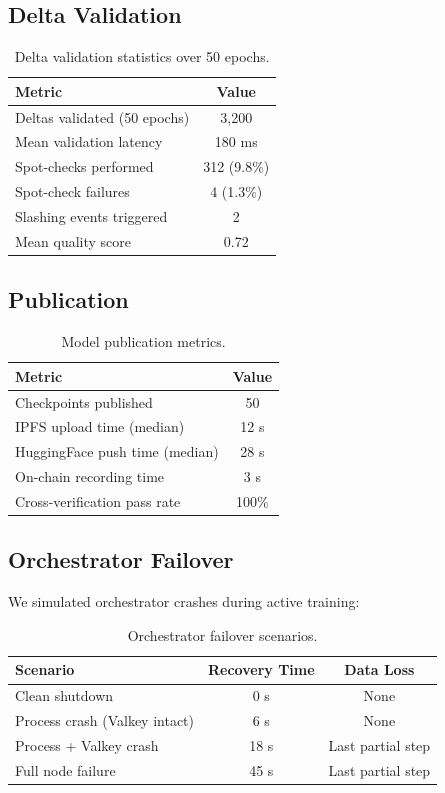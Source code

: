 \documentclass[11pt,letterpaper]{article}
\begin{document}
\subsection{Delta Validation}

\begin{table}[t]
\centering
\begin{tabular}{lc}
\toprule
\textbf{Metric} & \textbf{Value} \\
\midrule
Deltas validated (50 epochs) & 3{,}200 \\
Mean validation latency & 180 ms \\
Spot-checks performed & 312 (9.8\%) \\
Spot-check failures & 4 (1.3\%) \\
Slashing events triggered & 2 \\
Mean quality score & 0.72 \\
\bottomrule
\end{tabular}
\caption{Delta validation statistics over 50 epochs.}
\label{tab:validation}
\end{table}

\subsection{Publication}

\begin{table}[t]
\centering
\begin{tabular}{lc}
\toprule
\textbf{Metric} & \textbf{Value} \\
\midrule
Checkpoints published & 50 \\
IPFS upload time (median) & 12 s \\
HuggingFace push time (median) & 28 s \\
On-chain recording time & 3 s \\
Cross-verification pass rate & 100\% \\
\bottomrule
\end{tabular}
\caption{Model publication metrics.}
\label{tab:publication}
\end{table}

\subsection{Orchestrator Failover}

We simulated orchestrator crashes during active training:

\begin{table}[t]
\centering
\begin{tabular}{lcc}
\toprule
\textbf{Scenario} & \textbf{Recovery Time} & \textbf{Data Loss} \\
\midrule
Clean shutdown & 0 s & None \\
Process crash (Valkey intact) & 6 s & None \\
Process + Valkey crash & 18 s & Last partial step \\
Full node failure & 45 s & Last partial step \\
\bottomrule
\end{tabular}
\caption{Orchestrator failover scenarios.}
\label{tab:failover}
\end{table}
\end{document}
